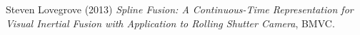 \documentclass[a4paper]{article}
\begin{document}
\newpage

\begin{thebibliography}{9}

Steven Lovegrove (2013) \emph{Spline Fusion: A Continuous-Time Representation for Visual Inertial Fusion with Application to Rolling Shutter Camera}, BMVC.

\end{thebibliography}
\end{document}
